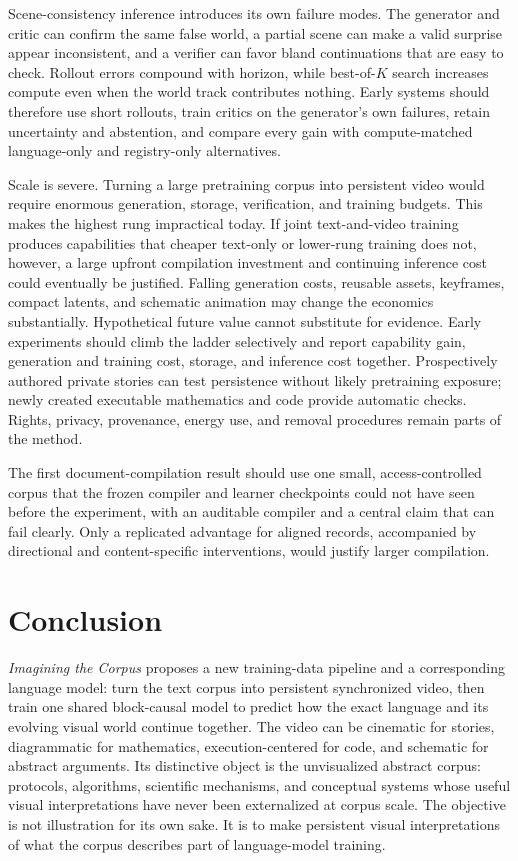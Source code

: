 \documentclass[11pt]{article}
\begin{document}
Scene-consistency inference introduces its own failure modes. The generator and critic can confirm the same false world, a partial scene can make a valid surprise appear inconsistent, and a verifier can favor bland continuations that are easy to check. Rollout errors compound with horizon, while best-of-$K$ search increases compute even when the world track contributes nothing. Early systems should therefore use short rollouts, train critics on the generator's own failures, retain uncertainty and abstention, and compare every gain with compute-matched language-only and registry-only alternatives.

Scale is severe. Turning a large pretraining corpus into persistent video would require enormous generation, storage, verification, and training budgets. This makes the highest rung impractical today. If joint text-and-video training produces capabilities that cheaper text-only or lower-rung training does not, however, a large upfront compilation investment and continuing inference cost could eventually be justified. Falling generation costs, reusable assets, keyframes, compact latents, and schematic animation may change the economics substantially. Hypothetical future value cannot substitute for evidence. Early experiments should climb the ladder selectively and report capability gain, generation and training cost, storage, and inference cost together. Prospectively authored private stories can test persistence without likely pretraining exposure; newly created executable mathematics and code provide automatic checks. Rights, privacy, provenance, energy use, and removal procedures remain parts of the method.

The first document-compilation result should use one small, access-controlled corpus that the frozen compiler and learner checkpoints could not have seen before the experiment, with an auditable compiler and a central claim that can fail clearly. Only a replicated advantage for aligned records, accompanied by directional and content-specific interventions, would justify larger compilation.

\section{Conclusion}

\emph{Imagining the Corpus} proposes a new training-data pipeline and a corresponding language model: turn the text corpus into persistent synchronized video, then train one shared block-causal model to predict how the exact language and its evolving visual world continue together. The video can be cinematic for stories, diagrammatic for mathematics, execution-centered for code, and schematic for abstract arguments. Its distinctive object is the unvisualized abstract corpus: protocols, algorithms, scientific mechanisms, and conceptual systems whose useful visual interpretations have never been externalized at corpus scale. The objective is not illustration for its own sake. It is to make persistent visual interpretations of what the corpus describes part of language-model training.
\end{document}
